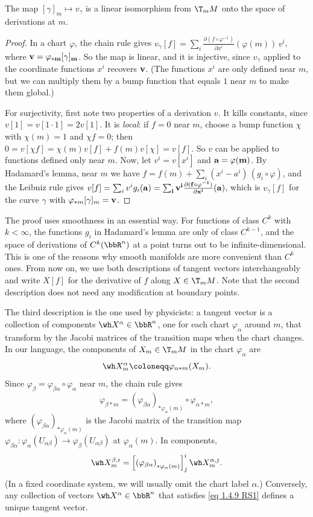 \begin{prop}
    The map $[\gamma]_m\mapsto v_\gamma$ is a linear isomorphism from $\T_mM$ onto the space of derivations at $m$.
\end{prop}
\begin{proof}
    In a chart $\varphi$, the chain rule gives $v_\gamma[f]=\sum_i\frac{\partial(f\circ\varphi^{-1})}{\partial x^i}(\varphi(m))\,v^i$, where $\bf{v}=\varphi_{\ast m}[\gamma]_m$. So the map is linear, and it is injective, since $v_\gamma$ applied to the coordinate functions $x^i$ recovers $\bf{v}$. (The functions $x^i$ are only defined near $m$, but we can multiply them by a bump function that equals $1$ near $m$ to make them global.)

    For surjectivity, first note two properties of a derivation $v$. It kills constants, since $v[1]=v[1\cdot1]=2v[1]$. It is \emph{local}: if $f=0$ near $m$, choose a bump function $\chi$ with $\chi(m)=1$ and $\chi f=0$; then $0=v[\chi f]=\chi(m)v[f]+f(m)v[\chi]=v[f]$. So $v$ can be applied to functions defined only near $m$. Now, let $v^i=v[x^i]$ and $\bf{a}=\varphi(m)$. By Hadamard's lemma, near $m$ we have $f=f(m)+\sum_i(x^i-a^i)\,(g_i\circ\varphi)$, and the Leibniz rule gives $v[f]=\sum_iv^ig_i(\bf{a})=\sum_iv^i\frac{\partial(f\circ\varphi^{-1})}{\partial x^i}(\bf{a})$, which is $v_\gamma[f]$ for the curve $\gamma$ with $\varphi_{\ast m}[\gamma]_m=\bf{v}$.
\end{proof}
The proof uses smoothness in an essential way. For functions of class $C^k$ with $k<\infty$, the functions $g_i$ in Hadamard's lemma are only of class $C^{k-1}$, and the space of derivations of $C^k(\bbR^n)$ at a point turns out to be infinite-dimensional. This is one of the reasons why smooth manifolds are more convenient than $C^k$ ones. From now on, we use both descriptions of tangent vectors interchangeably and write $X[f]$ for the derivative of $f$ along $X\in\T_mM$. Note that the second description does not need any modification at boundary points.

The third description is the one used by physicists: a tangent vector is a collection of components $\wh X^\alpha\in\bbR^n$, one for each chart $\varphi_\alpha$ around $m$, that transform by the Jacobi matrices of the transition maps when the chart changes. In our language, the components of $X_m\in\T_mM$ in the chart $\varphi_\alpha$ are
\[\wh X^\alpha_m\coloneqq\varphi_{\alpha\ast m}(X_m).\label{eq 1.4.8 RS1}\]
Since $\varphi_\beta=\varphi_{\beta\alpha}\circ\varphi_\alpha$ near $m$, the chain rule gives
\[\varphi_{\beta\ast m}=\left(\varphi_{\beta\alpha}\right)_{\ast\varphi_\alpha(m)}\circ\varphi_{\alpha\ast m},\label{eq 1.4.5 RS1}\]
where $\left(\varphi_{\beta\alpha}\right)_{\ast\varphi_\alpha(m)}$ is the Jacobi matrix of the transition map $\varphi_{\beta\alpha}:\varphi_\alpha(U_{\alpha\beta})\to\varphi_\beta(U_{\alpha\beta})$ at $\varphi_\alpha(m)$. In components,
\[\wh X^{\beta,i}_m=\left[\left(\varphi_{\beta\alpha}\right)_{\ast\varphi_\alpha(m)}\right]^i_j\wh X^{\alpha,j}_m.\label{eq 1.4.9 RS1}\]
(In a fixed coordinate system, we will usually omit the chart label $\alpha$.) Conversely, any collection of vectors $\wh X^\alpha\in\bbR^n$ that satisfies \eqref{eq 1.4.9 RS1} defines a unique tangent vector.

